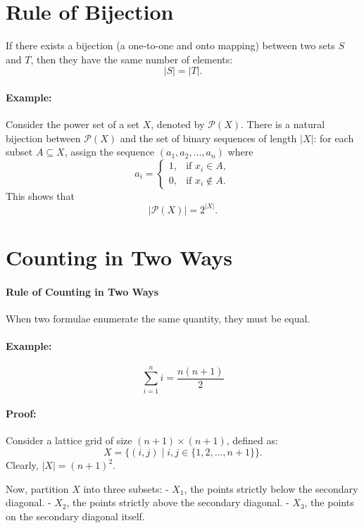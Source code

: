 \section{Rule of Bijection}
If there exists a bijection (a one-to-one and onto mapping) between two sets $S$ and $T$, then they have the same number of elements:
\[
|S| = |T|.
\]

\paragraph{Example:}  
Consider the power set of a set $X$, denoted by $\mathcal{P}(X)$. There is a natural bijection between $\mathcal{P}(X)$ and the set of binary sequences of length $|X|$: for each subset $A \subseteq X$, assign the sequence $(a_1,a_2,\dots,a_n)$ where 
\[
a_i = \begin{cases} 
1, & \text{if } x_i \in A, \\
0, & \text{if } x_i \notin A.
\end{cases}
\]
This shows that 
\[
|\mathcal{P}(X)| = 2^{|X|}.
\]

\section{Counting in Two Ways}  

\paragraph{Rule of Counting in Two Ways}  
When two formulae enumerate the same quantity, they must be equal.  

\paragraph{Example:}  
\[
\sum_{i=1}^{n} i = \frac{n(n+1)}{2}
\]

\paragraph{Proof:}  
Consider a lattice grid of size \( (n+1) \times (n+1) \), defined as:  
\[
X = \{(i, j) \mid i, j \in \{1, 2, \dots, n+1\} \}.
\]  
Clearly, \( |X| = (n+1)^2 \).  

Now, partition \( X \) into three subsets:  
- \( X_1 \), the points strictly below the secondary diagonal.  
- \( X_2 \), the points strictly above the secondary diagonal.  
- \( X_3 \), the points on the secondary diagonal itself.  

